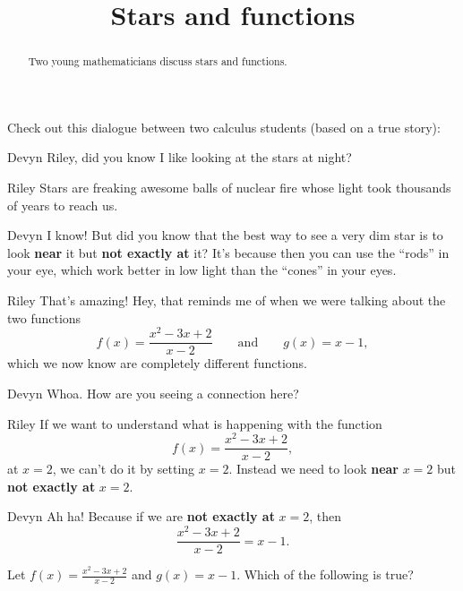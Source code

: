 \documentclass{ximera}
\title[Break-Ground:]{Stars and functions}
\begin{document}
\begin{abstract}
Two young mathematicians discuss stars and functions.
\end{abstract}
\maketitle

Check out this dialogue between two calculus students (based on a true
story):

\begin{dialogue}
\item[Devyn] Riley, did you know I like looking at the stars at night?
\item[Riley] Stars are freaking awesome balls of nuclear fire whose
  light took thousands of years to reach us.
\item[Devyn] I know! But did you know that the best way to see a very
  dim star is to look \textbf{near} it but \textbf{not exactly at} it? It's
  because then you can use the ``rods'' in your eye, which work better
  in low light than the ``cones'' in your eyes.
\item[Riley] That's amazing! Hey, that reminds me of when we were talking about the two functions
  \[
  f(x) = \frac{x^2-3x+2}{x-2}\qquad\text{and}\qquad g(x)= x-1,
  \]
  which we now know are completely different functions.
\item[Devyn] Whoa. How are you seeing a connection here?
\item[Riley] If we want to understand what is happening with the
  function
  \[
  f(x) = \frac{x^2-3x+2}{x-2},
  \]
  at $x=2$, we can't do it by setting $x=2$. Instead we need to look
  \textbf{near} $x=2$ but \textbf{not exactly at} $x=2$.
  \item[Devyn] Ah ha! Because if we are \textbf{not exactly at} $x=2$,
    then
    \[
    \frac{x^2-3x+2}{x-2} = x-1.
    \]
\end{dialogue}

\begin{problem}
  Let $f(x) = \frac{x^2-3x+2}{x-2}$ and $g(x) = x-1$. Which of the following is true?
  \begin{multipleChoice}
  \end{multipleChoice}
\end{problem}
\end{document}
